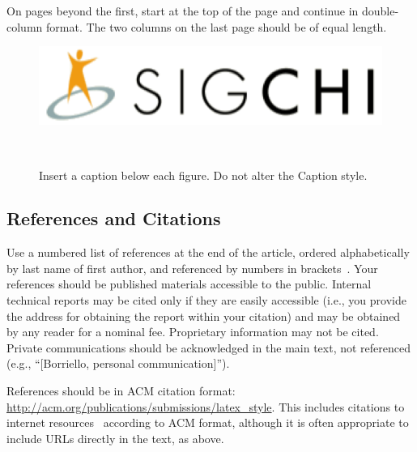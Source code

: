 \documentclass{sigchi}
\begin{document}
On pages beyond the first, start at the top of the page and continue
in double-column format.  The two columns on the last page should be
of equal length.

\begin{figure}
\centering
  \includegraphics[width=0.9\columnwidth]{figures/sigchi-logo}
  \caption{Insert a caption below each figure. Do not alter the
    Caption style.}~\label{fig:figure1}
\end{figure}

\subsection{References and Citations}

Use a numbered list of references at the end of the article, ordered
alphabetically by last name of first author, and referenced by numbers
in 
brackets~\cite{acm_categories,ethics,Klemmer:2002:WSC:503376.503378}.
Your references should be published materials accessible to the
public. Internal technical reports may be cited only if they are
easily accessible (i.e., you provide the address for obtaining the
report within your citation) and may be obtained by any reader for a
nominal fee. Proprietary information may not be cited. Private
communications should be acknowledged in the main text, not referenced
(e.g., ``[Borriello, personal communication]'').

References should be in ACM citation format:
\url{http://acm.org/publications/submissions/latex_style}. This
includes citations to internet
resources~\cite{acm_categories,cavender:writing,CHINOSAUR:venue,psy:gangnam}
according to ACM format, although it is often appropriate to include
URLs directly in the text, as above.


\end{document}
